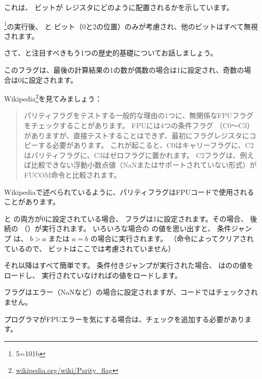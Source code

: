 

これは、 \CThreeBits ビットが \AH レジスタにどのように配置されるかを示しています。



\footnote{5=101b}の実行後、
\Czero と \Ctwo ビット（0と2の位置）のみが考慮され、他のビットはすべて無視されます。

\label{parity_flag}

さて、と注目すべきもう1つの歴史的基礎についてお話しましょう。

このフラグは、最後の計算結果の1の数が偶数の場合は1に設定され、奇数の場合は0に設定されます。

Wikipedia\footnote{\href{http://go.yurichev.com/17131}{wikipedia.org/wiki/Parity\_flag}}を見てみましょう：

\begin{framed}
\begin{quotation}
パリティフラグをテストする一般的な理由の1つに、無関係なFPUフラグをチェックすることがあります。 FPUには4つの条件フラグ
（C0～C3）がありますが、直接テストすることはできず、最初にフラグレジスタにコピーする必要があります。 
これが起こると、C0はキャリーフラグに、C2はパリティフラグに、C3はゼロフラグに置かれます。 
C2フラグは、例えば比較できない浮動小数点値（NaNまたはサポートされていない形式）がFUCOM命令と比較されます。
\end{quotation}
\end{framed}

Wikipediaで述べられているように、パリティフラグはFPUコードで使用されることがあります。


\Czero と \Ctwo の両方が0に設定されている場合、 \PF フラグは1に設定されます。その場合、
後続の \JP （）が実行されます。 
いろいろな場合の \CThreeBits の値を思い出すと、
条件ジャンプ \JP は、 $b>a$ または $a=b$ の場合に実行されます。
（命令によってクリアされているので、 \Cthree ビットはここでは考慮されていません）

それ以降はすべて簡単です。 
条件付きジャンプが実行された場合、
\FLD はのの値をロードし、
実行されていなければの値をロードします。


\Ctwo フラグはエラー（\gls{NaN}など）の場合に設定されますが、コードではチェックされません。

プログラマがFPUエラーを気にする場合は、チェックを追加する必要があります。


